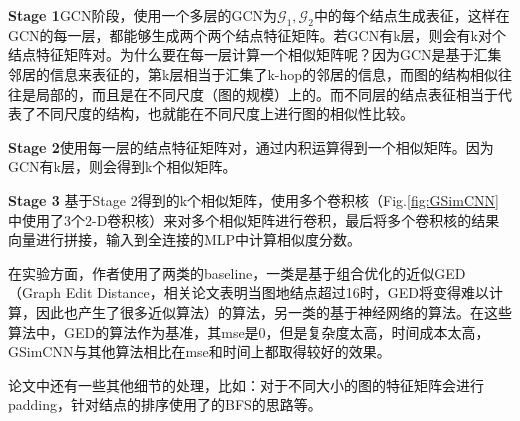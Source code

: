 {\textcolor[RGB]{64, 177, 189}{\textbf{Stage 1}}}\hspace{12pt}GCN阶段，使用一个多层的GCN为$\mathcal{G}_1, \mathcal{G}_2$中的每个结点生成表征，这样在GCN的每一层，都能够生成两个两个结点特征矩阵。若GCN有k层，则会有k对个结点特征矩阵对。{\color{red}为什么要在每一层计算一个相似矩阵呢？}因为GCN是基于汇集邻居的信息来表征的，第k层相当于汇集了k-hop的邻居的信息，而图的结构相似往往是局部的，而且是在不同尺度（图的规模）上的。而不同层的结点表征相当于代表了不同尺度的结构，也就能在不同尺度上进行图的相似性比较。  

{\color{red}\textbf{Stage 2}}\hspace{12pt}使用每一层的结点特征矩阵对，通过内积运算得到一个相似矩阵。因为GCN有k层，则会得到k个相似矩阵。

{\color{blue}\textbf{Stage 3} }\hspace{12pt}基于{\color{red}Stage 2}得到的k个相似矩阵，使用多个卷积核（Fig.\ref{fig:GSimCNN}中使用了3个2-D卷积核）来对多个相似矩阵进行卷积，最后将多个卷积核的结果向量进行拼接，输入到全连接的MLP中计算相似度分数。

在实验方面，作者使用了两类的baseline，一类是基于组合优化的近似GED（Graph  Edit Distance，相关论文表明当图地结点超过16时，GED将变得难以计算\cite{arora2019exact}，因此也产生了很多近似算法）的算法，另一类的基于神经网络的算法。在这些算法中，GED的算法作为基准，其mse是0，但是复杂度太高，时间成本太高，GSimCNN与其他算法相比在mse和时间上都取得较好的效果。

论文中还有一些其他细节的处理，比如：对于不同大小的图的特征矩阵会进行padding，针对结点的排序使用了\cite{you2018graphrnn}的BFS的思路等。

